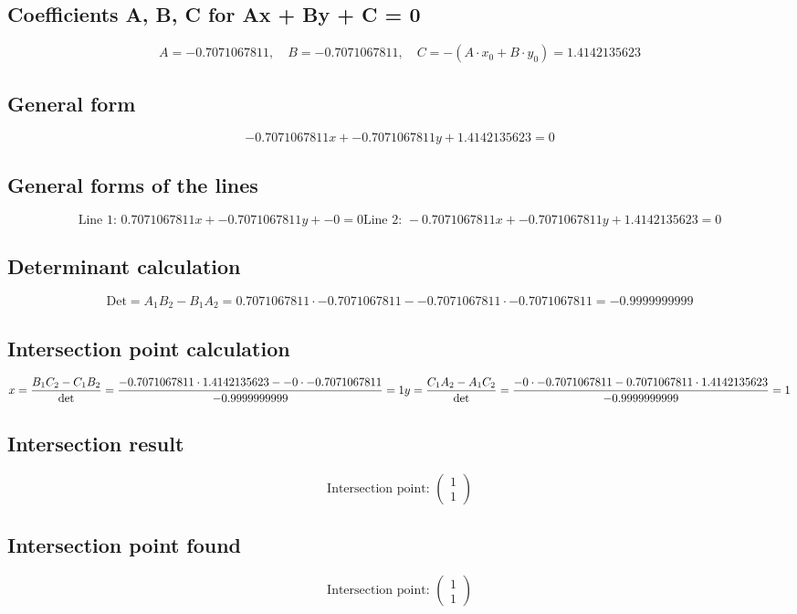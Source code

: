 \documentclass{article}
\begin{document}
\subsection*{ \vspace{1em} Coefficients A, B, C for Ax + By + C = 0}
\[
A = -0.7071067811,\quad B = -0.7071067811,\quad C = - (A \cdot x_0 + B \cdot y_0) = 1.4142135623
\]
\subsection*{ \vspace{1em} General form}
\[
-0.7071067811x + -0.7071067811y + 1.4142135623 = 0
\]
\subsection*{ \vspace{1em} General forms of the lines}
\[
\text{Line 1: } 0.7071067811x + -0.7071067811y + -0 = 0
\text{Line 2: } -0.7071067811x + -0.7071067811y + 1.4142135623 = 0
\]
\subsection*{ \vspace{1em} Determinant calculation}
\[
\text{Det} = A_1 B_2 - B_1 A_2 = 0.7071067811 \cdot -0.7071067811 - -0.7071067811 \cdot -0.7071067811 = -0.9999999999
\]
\subsection*{ \vspace{1em} Intersection point calculation}
\[
x = \frac{B_1 C_2 - C_1 B_2}{\det} = \frac{-0.7071067811 \cdot 1.4142135623 - -0 \cdot -0.7071067811}{-0.9999999999} = 1\\y = \frac{C_1 A_2 - A_1 C_2}{\det} = \frac{-0 \cdot -0.7071067811 - 0.7071067811 \cdot 1.4142135623}{-0.9999999999} = 1
\]
\subsection*{ \vspace{1em} Intersection result}
\[
\text{Intersection point: } \begin{pmatrix}1 \\ 1\end{pmatrix}
\]
\subsection*{ \vspace{1em} Intersection point found}
\[
\text{Intersection point: } \begin{pmatrix}1 \\ 1\end{pmatrix}
\]
\end{document}
